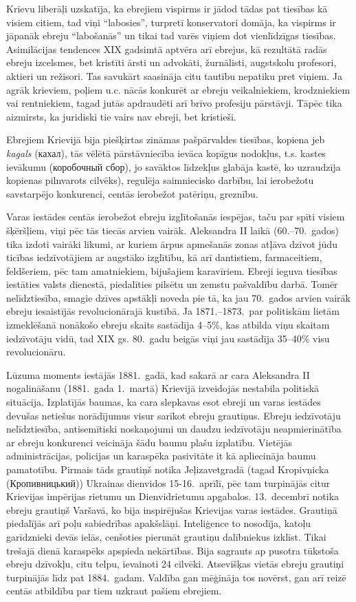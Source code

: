 \documentclass[twoside,a5paper,12pt,fleqn,openany]{extbook}
\newcommand{\rutxti}[1]{\textrussian{#1}}
\newcommand{\uktxti}[1]{\textukrainian{#1}}
\begin{document}
Krievu liberāļi uzskatīja, ka ebrejiem vispirms ir jādod tādas pat tiesības kā visiem citiem, tad viņi ``labosies'', turpretī konservatori domāja, ka vispirms ir jāpanāk ebreju ``labošanās'' un tikai tad varēs viņiem dot vienlīdzīgas tiesības. Asimilācijas tendences XIX gadsimtā aptvēra arī ebrejus, kā rezultātā radās ebreju izcelsmes, bet kristīti ārsti un advokāti, žurnālisti, augstskolu profesori, aktieri un režisori. Tas savukārt saasināja citu tautību nepatiku pret viņiem. Ja agrāk krieviem, poļiem u.c. nācās konkurēt ar ebreju veikalniekiem, krodzniekiem vai rentniekiem, tagad jutās apdraudēti arī brīvo profesiju pārstāvji. Tāpēc tika aizmirsts, ka juridiski tie vairs nav ebreji, bet kristieši.

Ebrejiem Krievijā bija piešķirtas zināmas pašpārvaldes tiesības, kopiena jeb \emph{kagals} (\rutxti{кахал}), tās vēlētā pārstāvniecība ievāca kopīgus nodokļus, t.s. kastes ievākumu (\rutxti{коробочный сбор}), jo savāktos līdzekļus glabāja kastē, ko uzraudzīja kopienas pilnvarots cilvēks), regulēja saimniecisko darbību, lai ierobežotu savstarpējo konkurenci, centās ierobežot patēriņu, greznību.

Varas iestādes centās ierobežot ebreju izglītošanās iespējas, taču par spīti visiem šķēršļiem, viņi pēc tās tiecās arvien vairāk. Aleksandra II laikā (60.--70.~gados) tika izdoti vairāki likumi, ar kuriem ārpus apmešanās zonas atļāva dzīvot jūdu ticības iedzīvotājiem ar augstāko izglītību, kā arī dantistiem, farmaceitiem, feldšeriem, pēc tam amatniekiem, bijušajiem karavīriem. Ebreji ieguva tiesības iestāties valsts dienestā, piedalīties pilsētu un zemstu pašvaldību darbā. Tomēr nelīdztiesība, smagie dzīves apstākļi noveda pie tā, ka jau 70.~gados arvien vairāk ebreju iesaistījās revolucionārajā kustībā. Ja 1871.--1873.~par politiskām lietām izmeklēšanā nonākošo ebreju skaits sastādīja 4--5\%, kas atbilda viņu skaitam iedzīvotāju vidū, tad XIX gs. 80.~gadu beigās viņi jau sastādīja 35--40\% visu revolucionāru.

Lūzuma moments iestājās 1881.~gadā, kad sakarā ar cara Aleksandra II nogalināšanu (1881.~gada 1.~martā) Krievijā izveidojās nestabila politiskā situācija. Izplatījās baumas, ka cara slepkavas esot ebreji un varas iestādes devušas netiešus norādījumus visur sarīkot ebreju grautiņus. Ebreju iedzīvotāju nelīdztiesība, antisemītiski noskaņojumi un daudzu iedzīvotāju neapmierinātība ar ebreju konkurenci veicināja šādu baumu plašu izplatību. Vietējās administrācijas, policijas un karaspēka pasivitāte it kā apliecināja baumu pamatotību. Pirmais tāds grautiņš notika Jeļizavetgradā (tagad Kropivņicka (\uktxti{Кропивницький})) Ukrainas dienvidos 15-16.~aprīlī, pēc tam turpinājās citur Krievijas impērijas rietumu un Dienvidrietumu apgabalos. 13.~decembrī notika ebreju grautiņš Varšavā, ko bija inspirējušas Krievijas varas iestādes. Grautiņā piedalījās arī poļu sabiedrības apakšslāņi. Inteliģence to nosodīja, katoļu garīdznieki devās ielās, cenšoties pierunāt grautiņu dalībniekus izklīst. Tikai trešajā dienā karaspēks apspieda nekārtības. Bija sagrauts ap pusotra tūkstoša ebreju dzīvokļu, citu telpu, ievainoti 24 cilvēki. Atsevišķas vietās ebreju grautiņi turpinājās līdz pat 1884.~gadam. Valdība gan mēģināja tos novērst, gan arī reizē centās atbildību par tiem uzkraut pašiem ebrejiem.
\end{document}
